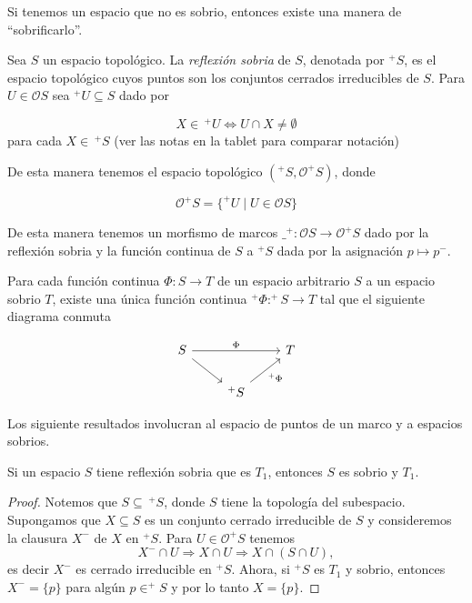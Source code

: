 Si tenemos un espacio que no es sobrio, entonces existe una manera de ``sobrificarlo''.

\begin{dfn}\label{Reflexion sobria}
    Sea $S$ un espacio topológico. La \emph{reflexión sobria} de $S$, denotada por $^+S$, es el espacio topológico cuyos puntos son los conjuntos cerrados irreducibles de $S$. Para $U\in \mathcal{O}S$ sea $^+U\subseteq S$ dado por 

    \[
    X\in\, ^+U \Leftrightarrow U\cap X\neq \emptyset
    \]
para cada $X\in\,^+S$ (ver las notas en la tablet para comparar notación) 
\end{dfn}

De esta manera tenemos el espacio topológico $(^+S, \mathcal{O}^+S)$, donde 

\[
\mathcal{O}^+S=\{^+U\mid U\in \mathcal{O}S\}
\]

De esta manera tenemos un morfismo de marcos $\_ ^+\colon \mathcal{O}S\to \mathcal{O} ^+S$ dado por la reflexión sobria y la función continua de $S$ a $^+S$ dada por la asignación $p\mapsto p^-$.

\begin{lem}
    Para cada función continua $\Phi\colon S\to T$ de un espacio arbitrario $S$ a un espacio sobrio $T$, existe una única función continua $^+\Phi\colon ^+S\to T$ tal que el siguiente diagrama conmuta

    \[\begin{tikzcd}
	S && T \\
	& {^+S}
	\arrow["\Phi", from=1-1, to=1-3]
	\arrow[from=1-1, to=2-2]
	\arrow["{^+\Phi}"', from=2-2, to=1-3]
\end{tikzcd}\]
\end{lem}

Los siguiente resultados involucran al espacio de puntos de un marco y a espacios sobrios.

\begin{lem}
    Si un espacio $S$ tiene reflexión sobria que es $T_1$, entonces $S$ es sobrio y $T_1$.
\end{lem}

\begin{proof}
    Notemos que $S\subseteq\, ^+S$, donde $S$ tiene la topología del subespacio. Supongamos que $X\subseteq S$ es un conjunto cerrado irreducible de $S$ y consideremos la clausura $X^-$ de $X$ en $^+S$. Para $U\in \mathcal{O}^+S$ tenemos
    \[
    X^{-}\cap U\Rightarrow X\cap U\Rightarrow X\cap (S\cap U),
    \]
    es decir $X^-$ es cerrado irreducible en $^+S$. Ahora, si $^+S$ es $T_1$ y sobrio, entonces $X^{-}=\{p\}$ para algún $p\in ^+S$ y por lo tanto $X=\{p\}$.
\end{proof}

